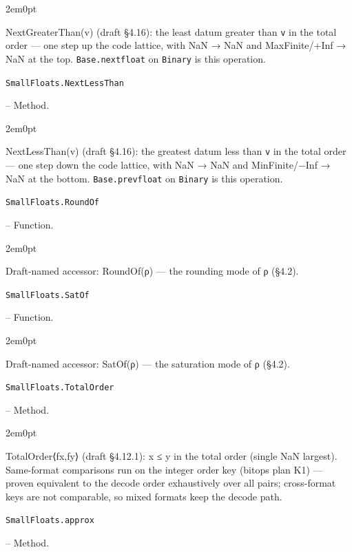 \begin{adjustwidth}{2em}{0pt}

NextGreaterThan(v) (draft §4.16): the least datum greater than \texttt{v} in the total order — one step up the code lattice, with NaN → NaN and MaxFinite/+Inf → NaN at the top. \texttt{Base.nextfloat} on \texttt{Binary} is this operation.



\end{adjustwidth}
\hypertarget{6098566503846399249}{\texttt{SmallFloats.NextLessThan}}  -- {Method.}

\begin{adjustwidth}{2em}{0pt}

NextLessThan(v) (draft §4.16): the greatest datum less than \texttt{v} in the total order — one step down the code lattice, with NaN → NaN and MinFinite/−Inf → NaN at the bottom. \texttt{Base.prevfloat} on \texttt{Binary} is this operation.



\end{adjustwidth}
\hypertarget{10219551362409877369}{\texttt{SmallFloats.RoundOf}}  -- {Function.}

\begin{adjustwidth}{2em}{0pt}

Draft-named accessor: RoundOf(ρ) — the rounding mode of ρ (§4.2).



\end{adjustwidth}
\hypertarget{15323456454116582477}{\texttt{SmallFloats.SatOf}}  -- {Function.}

\begin{adjustwidth}{2em}{0pt}

Draft-named accessor: SatOf(ρ) — the saturation mode of ρ (§4.2).



\end{adjustwidth}
\hypertarget{11021615464506174358}{\texttt{SmallFloats.TotalOrder}}  -- {Method.}

\begin{adjustwidth}{2em}{0pt}

TotalOrder⟨fx,fy⟩ (draft §4.12.1): x ≤ y in the total order (single NaN largest). Same-format comparisons run on the integer order key (bitops plan K1) — proven equivalent to the decode order exhaustively over all pairs; cross-format keys are not comparable, so mixed formats keep the decode path.



\end{adjustwidth}
\hypertarget{8320965106983893823}{\texttt{SmallFloats.approx}}  -- {Method.}

